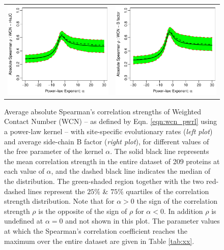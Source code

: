 \documentclass[11pt]{article}
\begin{document}
    \begin{figure}
        \begin{center}
        \begin{tabular}{cc}
            \includegraphics[width=3.3in]{../../wcn_best_definition/analysis/figures/get_quantiles/screen_plots/spcor_wcnpSC_r4sJC.pdf} & \includegraphics[width=3.3in]{../../wcn_best_definition/analysis/figures/get_quantiles/screen_plots/spcor_wcnpSC_bfSC.pdf}
        \end{tabular}
        \end{center}
        \caption{Average absolute Spearman's correlation strengths of Weighted Contact Number (WCN) -- as defined by Eqn. \ref{eqn:wcn_pwrl} using a power-law kernel -- with site-specific evolutionary rates ({\it left plot}) and average side-chain B factor ({\it right plot}), for different values of the free parameter of the kernel $\alpha$. The solid black line represents the mean correlation strength in the entire dataset of 209 proteins at each value of $\alpha$, and the dashed black line indicates the median of the distribution. The green-shaded region together with the two red-dashed lines represent the $25\%$ \& $75\%$ quartiles of the correlation strength distribution.  Note that for $\alpha>0$ the sign of the correlation strength $\rho$ is the opposite of the sign of $\rho$ for $\alpha<0$. In addition $\rho$ is undefined at $\alpha=0$ and not shown in this plot. The parameter values at which the Spearman's correlation coefficient reaches the maximum over the entire dataset are given in Table \ref{tab:xx}.}
        \label{fig:wcnp}
    \end{figure}
\end{document}
